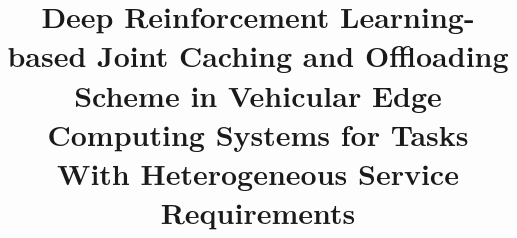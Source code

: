 \documentclass[lettersize,journal]{IEEEtran}
\begin{document}
\title{Deep Reinforcement Learning-based Joint Caching and Offloading Scheme in Vehicular Edge Computing Systems for Tasks With Heterogeneous Service Requirements}








\author{ ~}



\maketitle
\end{document}
